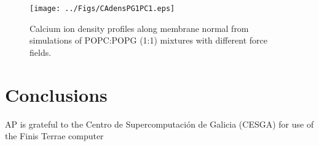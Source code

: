 \documentclass[aps,prl,superscriptaddress,twocolumn]{revtex4}
\begin{document}
\begin{figure}[]
  \centering
  \texttt{[image: ../Figs/CAdensPG1PC1.eps]}
  \caption{\label{CAdensPG}
    Calcium ion density profiles along membrane normal from simulations of POPC:POPG (1:1) mixtures with different force fields.
  }
\end{figure}




\clearpage
\section{Conclusions}


%

\begin{acknowledgments}
AP is grateful to the Centro de
Supercomputación de Galicia (CESGA) for use of the Finis
Terrae computer
\end{acknowledgments}



\end{document}
